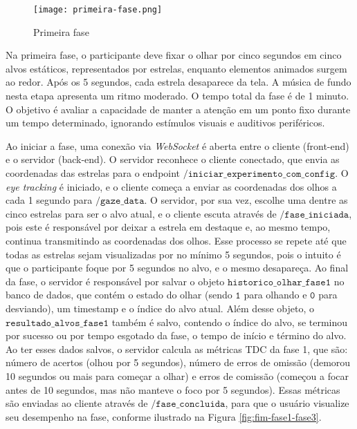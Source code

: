 \begin{figure}[H]
    \centering
    \caption{Primeira fase}%
    \label{fig:primeira-fase}
    \texttt{[image: primeira-fase.png]}%
\end{figure}

Na primeira fase, o participante deve fixar o olhar por cinco segundos em cinco alvos estáticos,
representados por estrelas, enquanto elementos animados surgem ao redor. Após os 5 segundos,
cada estrela desaparece da tela. A música de fundo nesta etapa apresenta um ritmo moderado. O tempo total da fase é de 1 minuto. O
objetivo é avaliar a capacidade de manter a atenção em um ponto fixo durante um tempo determinado, ignorando estímulos visuais e auditivos periféricos.

Ao iniciar a fase, uma conexão via \textit{WebSocket} é aberta entre o cliente (front-end) e o servidor (back-end). O servidor reconhece o cliente conectado, que envia as coordenadas das estrelas para o endpoint $\texttt{/iniciar\_experimento\_com\_config}$. O \textit{eye tracking} é iniciado, e o cliente começa a enviar as coordenadas dos olhos a cada 1 segundo para $\texttt{/gaze\_data}$. O servidor, por sua vez, escolhe uma dentre as cinco estrelas para ser o alvo atual, e o cliente escuta através de $\texttt{/fase\_iniciada}$, pois este é responsável por deixar a estrela em destaque e, ao mesmo tempo, continua transmitindo as coordenadas dos olhos. Esse processo se repete até que todas as estrelas sejam visualizadas por no mínimo 5 segundos, pois o intuito é que o participante foque por 5 segundos no alvo, e o mesmo desapareça. Ao final da fase, o servidor é responsável por salvar o objeto $\texttt{historico\_olhar\_fase1}$ no banco de dados, que contém o estado do olhar (sendo $\texttt{1}$ para olhando e $\texttt{0}$ para desviando), um timestamp e o índice do alvo atual. Além desse objeto, o $\texttt{resultado\_alvos\_fase1}$ também é salvo, contendo o índice do alvo, se terminou por sucesso ou por tempo esgotado da fase, o tempo de início e término do alvo. Ao ter esses dados salvos, o servidor calcula as métricas TDC da fase 1, que são: número de acertos (olhou por 5 segundos), número de erros de omissão (demorou 10 segundos ou mais para começar a olhar) e erros de comissão (começou a focar antes de 10 segundos, mas não manteve o foco por 5 segundos). Essas métricas são enviadas ao cliente através de $\texttt{/fase\_concluida}$, para que o usuário visualize seu desempenho na fase, conforme ilustrado na Figura \ref{fig:fim-fase1-fase3}.

